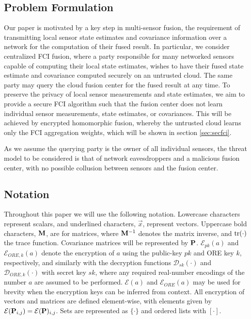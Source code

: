 \documentclass[letterpaper, 10 pt, conference]{ieeeconf}  %
\begin{document}
\subsection{Problem Formulation} \label{subsec:problem_formulation}
Our paper is motivated by a key step in multi-sensor fusion, the requirement of transmitting local sensor state estimates and covariance information over a network for the computation of their fused result. In particular, we consider centralized FCI fusion, where a party responsible for many networked sensors capable of computing their local state estimates, wishes to have their fused state estimate and covariance computed securely on an untrusted cloud. The same party may query the cloud fusion center for the fused result at any time. To preserve the privacy of local sensor measurements and state estimates, we aim to provide a secure FCI algorithm such that the fusion center does not learn individual sensor measurements, state estimates, or covariances. This will be achieved by encrypted homomorphic fusion, whereby the untrusted cloud learns only the FCI aggregation weights, which will be shown in section \ref{sec:secfci}.

As we assume the querying party is the owner of all individual sensors, the threat model to be considered is that of network eavesdroppers and a malicious fusion center, with no possible collusion between sensors and the fusion center.

\subsection{Notation}
Throughout this paper we will use the following notation. Lowercase characters represent scalars, and underlined characters, $\vec{x}$, represent vectors. Uppercase bold characters, ${{\mathbf{M}}}$, are for matrices, where ${{\mathbf{M}}}^{-1}$ denotes the matrix inverse, and $\operatorname{tr}(\cdot)$ the trace function. Covariance matrices will be represented by ${{\mathbf{P}}}$. $\mathcal{E}_{pk}(a)$ and $\mathcal{E}_{ORE,k}(a)$ denote the encryption of $a$ using the public-key $pk$ and ORE key $k$, respectively, and similarly with the decryption functions $\mathcal{D}_{sk}(\cdot)$ and $\mathcal{D}_{ORE,k}(\cdot)$ with secret key $sk$, where any required real-number encodings of the number $a$ are assumed to be performed. $\mathcal{E}(a)$ and $\mathcal{E}_{ORE}(a)$ may be used for brevity when the encryption keys can be inferred from context. All encryption of vectors and matrices are defined element-wise, with elements given by $\mathcal{E}({{\mathbf{P}}}_{i,j}) = \mathcal{E}({{\mathbf{P}}})_{i,j}$. Sets are represented as $\{\cdot\}$ and ordered lists with $[\cdot]$.
\end{document}
